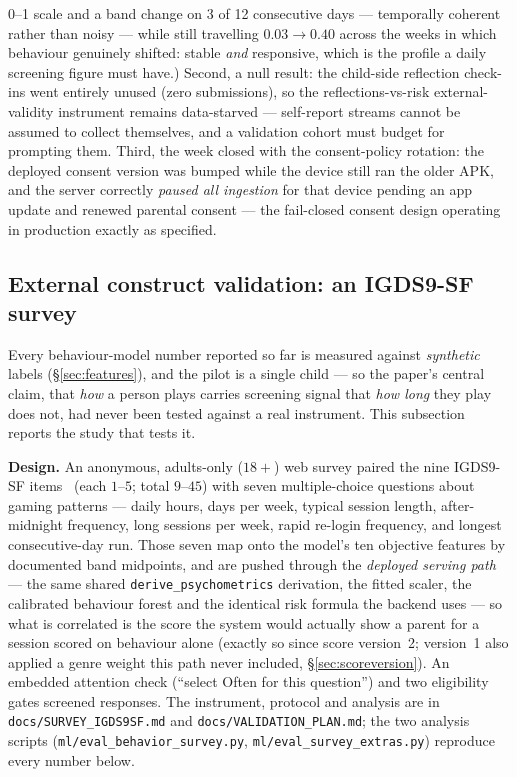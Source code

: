 \documentclass[11pt,a4paper]{article}
\begin{document}
0--1 scale and a band change on 3 of 12 consecutive days --- temporally coherent
rather than noisy --- while still travelling $0.03 \rightarrow 0.40$ across the
weeks in which behaviour genuinely shifted: stable \emph{and} responsive, which is
the profile a daily screening figure must have.) Second, a null result: the child-side reflection
check-ins went entirely unused (zero submissions), so the reflections-vs-risk
external-validity instrument remains data-starved --- self-report streams cannot be
assumed to collect themselves, and a validation cohort must budget for prompting
them. Third, the week closed with the consent-policy rotation: the deployed consent
version was bumped while the device still ran the older APK, and the server correctly
\emph{paused all ingestion} for that device pending an app update and renewed
parental consent --- the fail-closed consent design operating in production exactly
as specified.

\subsection{External construct validation: an IGDS9-SF survey}
\label{sec:survey}
Every behaviour-model number reported so far is measured against \emph{synthetic}
labels (\S\ref{sec:features}), and the pilot is a single child --- so the paper's
central claim, that \emph{how} a person plays carries screening signal that
\emph{how long} they play does not, had never been tested against a real
instrument. This subsection reports the study that tests it.

\textbf{Design.} An anonymous, adults-only ($18+$) web survey paired the nine
IGDS9-SF items~\cite{igds9sf} (each $1$--$5$; total $9$--$45$) with seven
multiple-choice questions about gaming patterns --- daily hours, days per week,
typical session length, after-midnight frequency, long sessions per week,
rapid re-login frequency, and longest consecutive-day run. Those seven map onto
the model's ten objective features by documented band midpoints, and are pushed
through the \emph{deployed serving path} --- the same shared
\texttt{derive\_psychometrics} derivation, the fitted scaler, the calibrated
behaviour forest and the identical risk formula the backend uses --- so what is
correlated is the score the system would actually show a parent for a session
scored on behaviour alone (exactly so since score version~2; version~1 also
applied a genre weight this path never included, \S\ref{sec:scoreversion}). An
embedded attention check (``select Often for this question'') and two
eligibility gates screened responses. The instrument, protocol and analysis are
in \texttt{docs/SURVEY\_IGDS9SF.md} and \texttt{docs/VALIDATION\_PLAN.md};
the two analysis scripts (\texttt{ml/eval\_behavior\_survey.py},
\texttt{ml/eval\_survey\_extras.py}) reproduce every number below.
\end{document}
